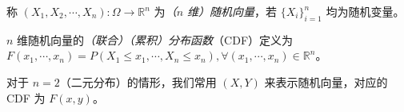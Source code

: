 \documentclass[../main.tex]{subfiles}
\begin{document}
\begin{definition}\label{def:3.1.1}
    称 $(X_1,X_2,\cdots,X_n):\Omega\rightarrow\mathbb R^n$ 为\emph{（$n$ 维）随机向量}，若 $\{X_i\}_{i=1}^n$ 均为随机变量。
\end{definition}

\begin{definition}\label{def:3.1.2}
    $n$ 维随机向量的\emph{（联合）（累积）分布函数}（CDF）定义为 $F(x_1,\cdots,x_n)=P(X_1\leq x_1,\cdots,X_n\leq x_n),\forall (x_1,\cdots,x_n)\in\mathbb R^n$。
\end{definition}

对于 $n=2$（二元分布）的情形，我们常用 $(X,Y)$ 来表示随机向量，对应的 CDF 为 $F(x,y)$。
\end{document}
